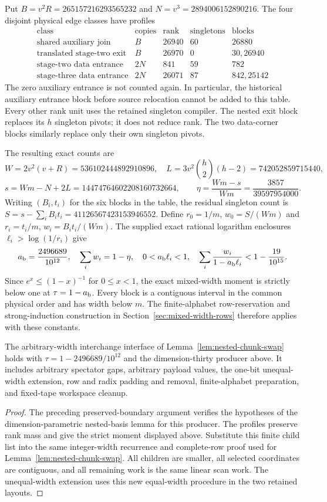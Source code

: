 Put $B=v^2R=265157216293565232$ and $N=v^3=2894006152890216$.
The four disjoint physical edge classes have profiles
\[
\begin{array}{l|r|r|r|l}
\text{class}&\text{copies}&\text{rank}&\text{singletons}&\text{blocks}\\\hline
\text{shared auxiliary join}&B&26940&60&26880\\
\text{translated stage-two exit}&B&26970&0&30,26940\\
\text{stage-two data entrance}&2N&841&59&782\\
\text{stage-three data entrance}&2N&26071&87&842,25142
\end{array}
\]
The zero auxiliary entrance is not counted again. In particular, the
historical auxiliary entrance block before source relocation cannot be
added to this table. Every other rank unit uses the retained singleton
compiler. The nested exit block replaces its $h$ singleton pivots; it
does not reduce rank. The two data-corner blocks similarly replace only
their own singleton pivots.

The resulting exact counts are
\[
 W=2v^2(v+R)=536102444892910896,\quad
 L=3v^2\binom h2(h-2)=742052859715440,
\]
\[
 s=Wm-N+2L=14474764602208160732664,\qquad
 \eta=\frac{Wm-s}{Wm}=\frac{3857}{39597954000}.
\]
Writing $(B_i,t_i)$ for the six blocks in the table, the residual singleton
count is $S=s-\sum_iB_it_i=41126567423153946552$. Define
$r_0=1/m$, $w_0=S/(Wm)$ and $r_i=t_i/m$, $w_i=B_it_i/(Wm)$.
The supplied exact rational logarithm enclosures $\ell_i>\log(1/r_i)$
give
\[
 a_{\rm b}=\frac{2496689}{10^{12}},\quad
 \sum_i w_i=1-\eta,\quad 0<a_{\rm b}\ell_i<1,\quad
 \sum_i\frac{w_i}{1-a_{\rm b}\ell_i}<1-\frac{19}{10^{15}}.
\]
Since $e^x\le(1-x)^{-1}$ for $0\le x<1$, the exact mixed-width
moment is strictly below one at $\tau=1-a_{\rm b}$. Every block is a
contiguous interval in the common physical order and has width below $m$.
The finite-alphabet row-reservation and strong-induction construction in
Section~\ref{sec:mixed-width-rows} therefore applies with these constants.

\begin{lemma}
\label{lem:stream-nested-chunk-swap}
The arbitrary-width interchange interface of
Lemma~\ref{lem:nested-chunk-swap} holds with
$\tau=1-2496689/10^{12}$ and the dimension-thirty producer above.
It includes arbitrary spectator gaps, arbitrary payload values, the
one-bit unequal-width extension, row and radix padding and removal,
finite-alphabet preparation, and fixed-tape workspace cleanup.
\end{lemma}
\begin{proof}
The preceding preserved-boundary argument verifies the hypotheses of
the dimension-parametric nested-basis lemma for this producer. The
profiles preserve rank mass and give the strict moment displayed above.
Substitute this finite child list into the same integer-width recurrence
and complete-row proof used for Lemma~\ref{lem:nested-chunk-swap}.
All children are smaller, all selected coordinates are contiguous, and
all remaining work is the same linear scan work. The unequal-width
extension uses this new equal-width procedure in the two retained layouts.
\end{proof}

